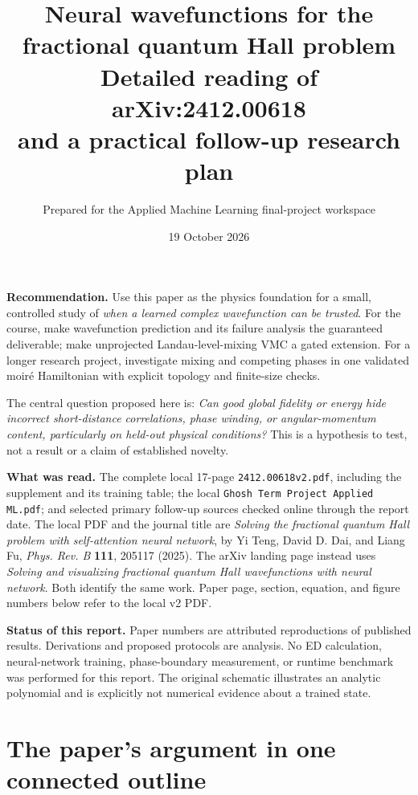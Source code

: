 \documentclass[11pt,letterpaper]{article}
\title{\textbf{Neural wavefunctions for the fractional quantum Hall problem}\\[6pt]\Large Detailed reading of arXiv:2412.00618\\and a practical follow-up research plan}
\author{Prepared for the Applied Machine Learning final-project workspace}
\date{19 October 2026}
\begin{document}
\maketitle

\begin{takeaway}
\textbf{Recommendation.} Use this paper as the physics foundation for a small, controlled study of \emph{when a learned complex wavefunction can be trusted}. For the course, make wavefunction prediction and its failure analysis the guaranteed deliverable; make unprojected Landau-level-mixing VMC a gated extension. For a longer research project, investigate mixing and competing phases in one validated moir\'e Hamiltonian with explicit topology and finite-size checks.

The central question proposed here is: \emph{Can good global fidelity or energy hide incorrect short-distance correlations, phase winding, or angular-momentum content, particularly on held-out physical conditions?} This is a hypothesis to test, not a result or a claim of established novelty.
\end{takeaway}

\textbf{What was read.} The complete local 17-page \texttt{2412.00618v2.pdf}, including the supplement and its training table; the local \texttt{Ghosh Term Project Applied ML.pdf}; and selected primary follow-up sources checked online through the report date. The local PDF and the journal title are \emph{Solving the fractional quantum Hall problem with self-attention neural network}, by Yi Teng, David D. Dai, and Liang Fu, \emph{Phys. Rev. B} \textbf{111}, 205117 (2025). The arXiv landing page instead uses \emph{Solving and visualizing fractional quantum Hall wavefunctions with neural network}. Both identify the same work. Paper page, section, equation, and figure numbers below refer to the local v2 PDF.\cite{teng}

\textbf{Status of this report.} Paper numbers are attributed reproductions of published results. Derivations and proposed protocols are analysis. No ED calculation, neural-network training, phase-boundary measurement, or runtime benchmark was performed for this report. The original schematic illustrates an analytic polynomial and is explicitly not numerical evidence about a trained state.

\newpage
\tableofcontents
\newpage

\section{The paper's argument in one connected outline}
\label{sec:outline}
\end{document}
